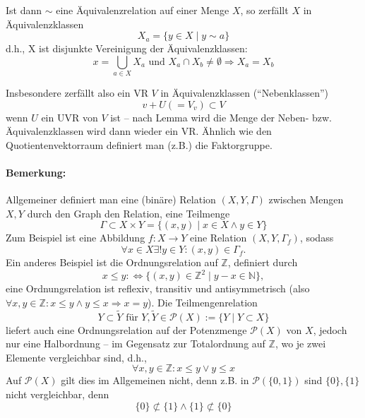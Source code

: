 	Ist dann $ \sim $ eine Äquivalenzrelation auf einer Menge $ X $, so zerfällt $ X $ in Äquivalenzklassen
		\[ X_a = \{y\in X\mid y\sim a\} \]
	d.h., X ist disjunkte Vereinigung der Äquivalenzklassen:
		\[ x = \bigcup_{a\in X}X_a \text{ und } X_a \cap X_b \neq \emptyset \Rightarrow X_a = X_b \]
		
	Insbesondere zerfällt also ein VR $ V $ in Äquivalenzklassen ("`Nebenklassen"')
		\[ v+U (= V_v)\subset V \]
	wenn $ U $ ein UVR von $ V $ ist -- nach Lemma wird die Menge der Neben- bzw. Äquivalenzklassen wird dann wieder ein VR. Ähnlich wie den Quotientenvektorraum definiert man (z.B.) die Faktorgruppe.
\paragraph{Bemerkung: }
	Allgemeiner definiert man eine (binäre) Relation $ (X,Y,\Gamma) $ zwischen Mengen $ X, Y $ durch den Graph den Relation, eine Teilmenge
		\[ \Gamma \subset X\times Y = \{(x,y)\mid x\in X \land y\in Y\} \]
	Zum Beispiel ist eine Abbildung $ f:X\to Y $ eine Relation $ (X,Y,\Gamma_f) $, sodass
		\[ \forall x\in X\exists ! y\in Y:(x,y)\in \Gamma_f. \]
	Ein anderes Beispiel ist die Ordnungsrelation auf $ \mathbb{Z} $, definiert durch
		\[ x\leq y :\Leftrightarrow \{(x,y)\in \mathbb{Z}^2\mid y-x\in \mathbb{N}\}, \]
	eine Ordnungsrelation ist reflexiv, transitiv und antisymmetrisch (also $ \forall x,y\in \mathbb{Z}: x\leq y\land y\leq x\Rightarrow x=y $).
	Die Teilmengenrelation
		\[ Y\subset\tilde{Y} \text{ für } Y,\tilde{Y}\in \mathcal{P}(X):= \{Y\mid Y\subset X\} \]
	liefert auch eine Ordnungsrelation auf der Potenzmenge $ \mathcal{P}(X) $ von $ X $, jedoch nur eine Halbordnung -- im Gegensatz zur Totalordnung auf $ \mathbb{Z} $, wo je zwei Elemente vergleichbar sind, d.h.,
		\[ \forall x,y\in \mathbb{Z}: x\leq y\lor y\leq x \]
	Auf $ \mathcal{P}(X) $ gilt dies im Allgemeinen nicht, denn z.B. in $ \mathcal{P}(\{0,1\}) $ sind $ \{0\},\{1\} $ nicht vergleichbar, denn
		\[ \{0\}\not\subset\{1\}\land \{1\}\not\subset \{0\} \]